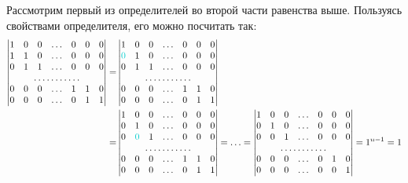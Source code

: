 \documentclass[a4paper,12pt]{article}
\begin{document}
\begin{solution}
    Рассмотрим первый из определителей во второй части равенства выше.
    Пользуясь свойствами определителя, его можно посчитать так:
    \begin{equation*}
    \begin{split}
      \begin{vmatrix}
        1 & 0 & 0 & \ldots & 0 & 0 & 0\\
        1 & 1 & 0 & \ldots & 0 & 0 & 0\\
        0 & 1 & 1 & \ldots & 0 & 0 & 0\\
        \hdotsfor{7}\\
        0 & 0 & 0 & \ldots & 1 & 1 & 0\\
        0 & 0 & 0 & \ldots & 0 & 1 & 1
      \end{vmatrix}
      = &\begin{vmatrix}
          1 & 0 & 0 & \ldots & 0 & 0 & 0\\
          \textcolor{light-cyan}{0} & 1 & 0 & \ldots & 0 & 0 & 0\\
          0 & 1 & 1 & \ldots & 0 & 0 & 0\\
          \hdotsfor{7}\\
          0 & 0 & 0 & \ldots & 1 & 1 & 0\\
          0 & 0 & 0 & \ldots & 0 & 1 & 1
        \end{vmatrix}\\
      = &\begin{vmatrix}
          1 & 0 & 0 & \ldots & 0 & 0 & 0\\
          0 & 1 & 0 & \ldots & 0 & 0 & 0\\
          0 & \textcolor{light-cyan}{0} & 1 & \ldots & 0 & 0 & 0\\
          \hdotsfor{7}\\
          0 & 0 & 0 & \ldots & 1 & 1 & 0\\
          0 & 0 & 0 & \ldots & 0 & 1 & 1
        \end{vmatrix}
      = \ldots
      = \begin{vmatrix}
          1 & 0 & 0 & \ldots & 0 & 0 & 0\\
          0 & 1 & 0 & \ldots & 0 & 0 & 0\\
          0 & 0 & 1 & \ldots & 0 & 0 & 0\\
          \hdotsfor{7}\\
          0 & 0 & 0 & \ldots & 0 & 1 & 0\\
          0 & 0 & 0 & \ldots & 0 & 0 & 1
        \end{vmatrix}
      = 1^{n - 1}
      = 1
    \end{split}
    \end{equation*}
    

\end{solution}
\end{document}

